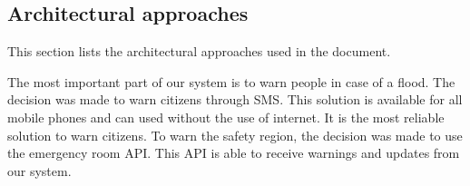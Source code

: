 

\subsection{Architectural approaches}
This section lists the architectural approaches used in the document.

The most important part of our system is to warn people in case of a flood. The decision was made to warn citizens through SMS. This solution is available for all mobile phones and can used without the use of internet. It is the most reliable solution to warn citizens. To warn the safety region, the decision was made to use the emergency room API. This API is able to receive warnings and updates from our system. 

